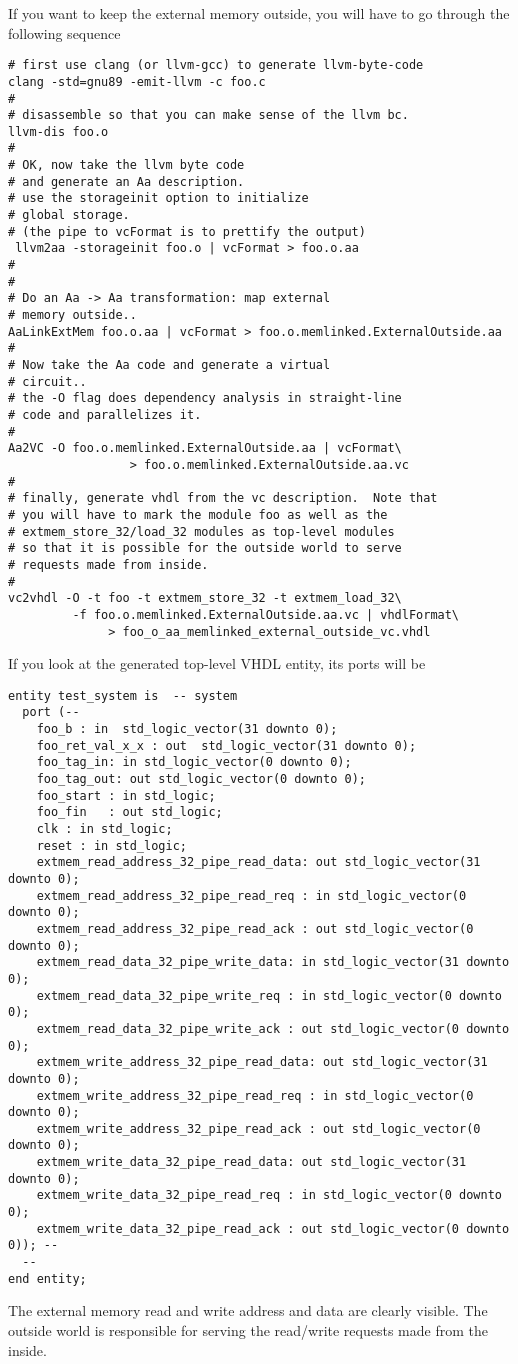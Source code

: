 \documentclass{article}
\begin{document}
If you want to keep the external memory
outside, you will have to go through the following sequence
\begin{verbatim}
# first use clang (or llvm-gcc) to generate llvm-byte-code
clang -std=gnu89 -emit-llvm -c foo.c
#
# disassemble so that you can make sense of the llvm bc.
llvm-dis foo.o
#
# OK, now take the llvm byte code
# and generate an Aa description.
# use the storageinit option to initialize
# global storage.
# (the pipe to vcFormat is to prettify the output)
 llvm2aa -storageinit foo.o | vcFormat > foo.o.aa
#
#
# Do an Aa -> Aa transformation: map external
# memory outside..
AaLinkExtMem foo.o.aa | vcFormat > foo.o.memlinked.ExternalOutside.aa
#
# Now take the Aa code and generate a virtual
# circuit..
# the -O flag does dependency analysis in straight-line
# code and parallelizes it.
#
Aa2VC -O foo.o.memlinked.ExternalOutside.aa | vcFormat\
                 > foo.o.memlinked.ExternalOutside.aa.vc
#
# finally, generate vhdl from the vc description.  Note that
# you will have to mark the module foo as well as the
# extmem_store_32/load_32 modules as top-level modules
# so that it is possible for the outside world to serve
# requests made from inside.
#
vc2vhdl -O -t foo -t extmem_store_32 -t extmem_load_32\ 
         -f foo.o.memlinked.ExternalOutside.aa.vc | vhdlFormat\
              > foo_o_aa_memlinked_external_outside_vc.vhdl

\end{verbatim}

If you look at the generated top-level VHDL entity, its ports
will be
\begin{verbatim}
entity test_system is  -- system
  port (--
    foo_b : in  std_logic_vector(31 downto 0);
    foo_ret_val_x_x : out  std_logic_vector(31 downto 0);
    foo_tag_in: in std_logic_vector(0 downto 0);
    foo_tag_out: out std_logic_vector(0 downto 0);
    foo_start : in std_logic;
    foo_fin   : out std_logic;
    clk : in std_logic;
    reset : in std_logic;
    extmem_read_address_32_pipe_read_data: out std_logic_vector(31 downto 0);
    extmem_read_address_32_pipe_read_req : in std_logic_vector(0 downto 0);
    extmem_read_address_32_pipe_read_ack : out std_logic_vector(0 downto 0);
    extmem_read_data_32_pipe_write_data: in std_logic_vector(31 downto 0);
    extmem_read_data_32_pipe_write_req : in std_logic_vector(0 downto 0);
    extmem_read_data_32_pipe_write_ack : out std_logic_vector(0 downto 0);
    extmem_write_address_32_pipe_read_data: out std_logic_vector(31 downto 0);
    extmem_write_address_32_pipe_read_req : in std_logic_vector(0 downto 0);
    extmem_write_address_32_pipe_read_ack : out std_logic_vector(0 downto 0);
    extmem_write_data_32_pipe_read_data: out std_logic_vector(31 downto 0);
    extmem_write_data_32_pipe_read_req : in std_logic_vector(0 downto 0);
    extmem_write_data_32_pipe_read_ack : out std_logic_vector(0 downto 0)); --
  --
end entity;
\end{verbatim}
The external memory read and write address and data are clearly
visible.   The outside world is responsible for serving the
read/write requests made from the inside.
\end{document}
